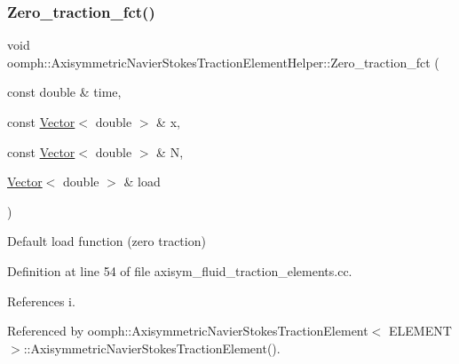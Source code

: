 \subsubsection{\texorpdfstring{Zero\+\_\+traction\+\_\+fct()}{Zero\_traction\_fct()}}
{\footnotesize\ttfamily void oomph\+::\+Axisymmetric\+Navier\+Stokes\+Traction\+Element\+Helper\+::\+Zero\+\_\+traction\+\_\+fct (\begin{DoxyParamCaption}\item[{const double \&}]{time,  }\item[{const \hyperlink{classoomph_1_1Vector}{Vector}$<$ double $>$ \&}]{x,  }\item[{const \hyperlink{classoomph_1_1Vector}{Vector}$<$ double $>$ \&}]{N,  }\item[{\hyperlink{classoomph_1_1Vector}{Vector}$<$ double $>$ \&}]{load }\end{DoxyParamCaption})}



Default load function (zero traction) 



Definition at line 54 of file axisym\+\_\+fluid\+\_\+traction\+\_\+elements.\+cc.



References i.



Referenced by oomph\+::\+Axisymmetric\+Navier\+Stokes\+Traction\+Element$<$ E\+L\+E\+M\+E\+N\+T $>$\+::\+Axisymmetric\+Navier\+Stokes\+Traction\+Element().

